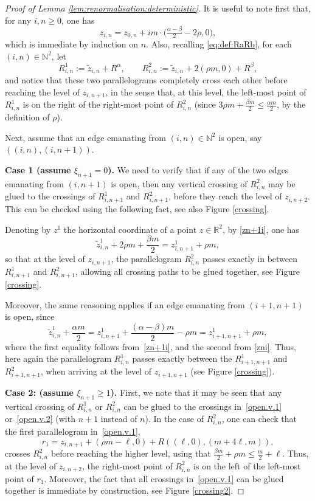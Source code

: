 \documentclass[pdflatex,sn-mathphys-num]{sn-jnl}%
\newcommand{\bbN}{{\ensuremath{\mathbb N}} }
\newcommand{\1}{{\ensuremath{\mathbf{1}}} }
\theoremstyle{thmstyleone}%
\theoremstyle{thmstyletwo}%
\theoremstyle{thmstylethree}%
\begin{document}
\begin{proof}[Proof of Lemma \ref{lem:renormalisation:deterministic}]
It is useful to note first that, for any $i,n\ge 0$, one has 
\begin{equation}\label{zni}
z_{i,n} = z_{0,n} + im\cdot \big(\tfrac{\alpha-\beta}{2} - 2\rho,0\big),
\end{equation} 
which is immediate by induction on $n$. Also, recalling \eqref{eq:def:RaRb}, for each $(i,n)\in \mathbb N^2$, let 
$$R^1_{i,n}:=\widetilde z_{i,n} + R^\alpha,\qquad   
 R^2_{i,n}:=\widetilde z_{i,n} + 2(\rho m,0) + R^\beta,$$ and notice that these two parallelograms completely cross each other before reaching the level of $z_{i,n+1}$, in the sense that, at this level, the left-most point
of $R^1_{i,n}$ is on the right of the right-most point of $R^2_{i,n}$ (since $3\rho m + \tfrac{\beta m}2 \le \tfrac{\alpha m}2$, by the definition of $\rho$). 

Next,  assume that an edge emanating from $(i,n)\in\bbN^2$ is open, say $((i,n),(i,n+1))$.


   
{\bf Case 1 {\rm (assume $\xi_{n+1} = 0$)}.}
We need to verify that if any of the two edges emanating from $(i,n+1)$ is open,  then any vertical crossing of $R^2_{i,n}$ may be glued to the crossings of $R_{i,n+1}^1$ and $R_{i,n+1}^2$, before they reach the level of $z_{i,n+2}$. This can be checked using the following fact, see also Figure \ref{crossing}. 

Denoting by $z^1$ the horizontal coordinate of a point $z\in \mathbb R^2$, by \eqref{zn+1i}, one has 
\[
\widetilde z_{i,n}^1 + 2\rho m + \frac{\beta m}2 = z_{i,n+1}^1 + \rho m, 
\]
so that at the level of $z_{i,n+1}$, the parallelogram $R_{i,n}^2$ passes exactly in between $R_{i,n+1}^1$ and $R_{i,n+1}^2$, allowing all crossing paths to be glued together, see Figure \ref{crossing}. 

Moreover, the same reasoning applies if an edge emanating from $(i+1,n+1)$ is open, since
$$\widetilde z_{i,n}^1 + \frac{\alpha m}{2} = z_{i,n+1}^1 + \frac{(\alpha -\beta)m}{2} -\rho m =  z_{i+1,n+1}^1 + \rho m, $$ 
where the first equality follows from~\eqref{zn+1i}, and the second from \eqref{zni}. Thus, here again the parallelogram $R_{i,n}^1$ passes exactly between the $R_{i+1,n+1}^1$ and $R_{i+1,n+1}^2$, when arriving at the level of $z_{i+1,n+1}$ (see Figure \ref{crossing}).

{\bf Case 2: {\rm (assume  $\xi_{n+1}\ge 1$)}.}
First, we note that 
it may be seen that any vertical crossing of $R_{i,n}^1$ or 
$R_{i,n}^2$ can be glued to the crossings in~\eqref{open.v.1} or~\eqref{open.v.2}
(with $n+1$ instead of $n$). In the case of $R_{i,n}^2$, one can check that the first parallelogram in~\eqref{open.v.1}, 
\[r_1=z_{i,n+1}+(\rho m-\ell,0)+R((\ell,0),(m+4\ell,m)),\]
crosses $R_{i,n}^2$ before reaching the higher level, using that $\frac{\beta m}{2} +\rho m \le \frac m 2 +\ell$. Thus, at the level of $z_{i,n+2}$, the right-most point of $R_{i,n}^2$ is on the left of the left-most point of $r_1$. Moreover, the fact that all crossings in~\eqref{open.v.1} can be glued together is immediate by construction, see Figure \ref{crossing2}. 


\end{proof}
\end{document}
